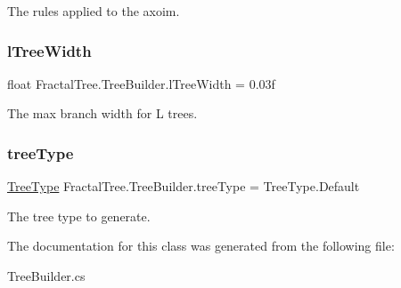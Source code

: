 The rules applied to the axoim. 

\hypertarget{class_fractal_tree_1_1_tree_builder_a382d4bba4cac7e05681e75109801dd92}{}\label{class_fractal_tree_1_1_tree_builder_a382d4bba4cac7e05681e75109801dd92} 
\subsubsection{\texorpdfstring{l\+Tree\+Width}{lTreeWidth}}
{\footnotesize\ttfamily float Fractal\+Tree.\+Tree\+Builder.\+l\+Tree\+Width = 0.\+03f}



The max branch width for L trees. 

\hypertarget{class_fractal_tree_1_1_tree_builder_aa2f66ebffbf59d18232884f85e95490d}{}\label{class_fractal_tree_1_1_tree_builder_aa2f66ebffbf59d18232884f85e95490d} 
\subsubsection{\texorpdfstring{tree\+Type}{treeType}}
{\footnotesize\ttfamily \hyperlink{class_fractal_tree_1_1_tree_builder_a955d67cfa976440cc427e591be74f979}{Tree\+Type} Fractal\+Tree.\+Tree\+Builder.\+tree\+Type = Tree\+Type.\+Default}



The tree type to generate. 



The documentation for this class was generated from the following file\+:\begin{DoxyCompactItemize}
\item 
Tree\+Builder.\+cs\end{DoxyCompactItemize}
